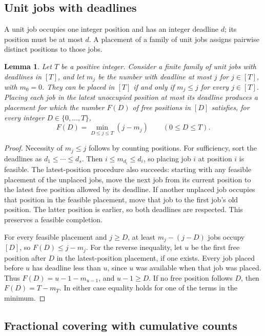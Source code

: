 \documentclass[11pt]{article}
\numberwithin{equation}{section}
\newtheorem{lemma}[theorem]{Lemma}
\theoremstyle{definition}
\begin{document}
\subsection{Unit jobs with deadlines}

A unit job occupies one integer position and has an integer deadline
$d$; its position must be at most $d$. A placement of a family of unit
jobs assigns pairwise distinct positions to those jobs.

\begin{lemma}\label{lem:deadlines}
Let $T$ be a positive integer. Consider a finite family of unit jobs
with deadlines in $[T]$, and let $m_j$ be the number
with deadline at most $j$ for $j\in[T]$, with $m_0=0$.
They can be placed in $[T]$ if and only if $m_j\le j$ for every $j\in[T]$.
Placing each job in the latest
unoccupied position at most its deadline produces a placement for which
the number $F(D)$ of free positions in $[D]$ satisfies, for every
integer $D\in\{0,\ldots,T\}$,
\begin{equation}\label{eq:free-positions}
 F(D)=\min_{D\le j\le T}(j-m_j)\qquad(0\le D\le T).
\end{equation}
\end{lemma}
\begin{proof}
Necessity of $m_j\le j$ follows by counting positions. For sufficiency,
sort the deadlines as $d_1\le\cdots\le d_s$. Then $i\le m_{d_i}\le d_i$,
so placing job $i$ at position $i$ is feasible.
The latest-position procedure also succeeds: starting with any feasible
placement of the unplaced jobs, move the next job from its current
position to the latest free position allowed by its deadline. If another
unplaced job occupies that position in the feasible placement, move that
job to the first job's old position. The latter position is earlier, so
both deadlines are respected. This preserves a feasible completion.

For every feasible placement and $j\ge D$, at least
$m_j-(j-D)$ jobs occupy $[D]$, so $F(D)\le j-m_j$.
For the reverse inequality, let $u$ be the first free position after
$D$ in the latest-position placement, if one exists. Every job placed
before $u$ has deadline less than $u$, since $u$ was available when that
job was placed. Thus $F(D)=u-1-m_{u-1}$, and $u-1\ge D$.
If no free position follows $D$, then $F(D)=T-m_T$.
In either case equality holds for one of the terms in the minimum.
\end{proof}

\subsection{Fractional covering with cumulative counts}
\end{document}
